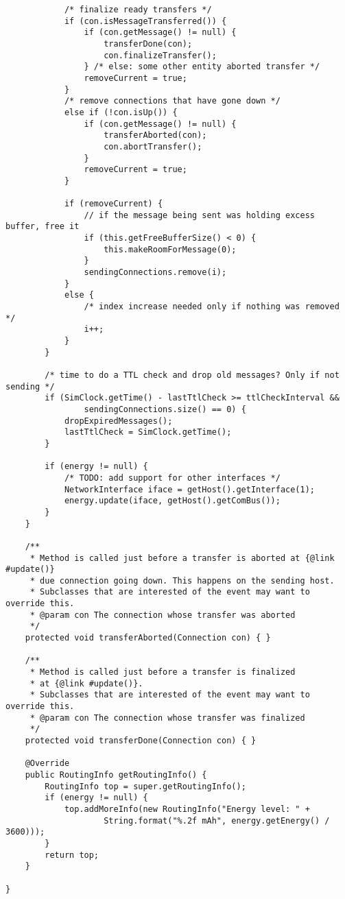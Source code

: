 \documentclass[11pt]{icsthesis}
\begin{document}
\begin{framed}
\begin{verbatim}
			/* finalize ready transfers */
			if (con.isMessageTransferred()) {
				if (con.getMessage() != null) {
					transferDone(con);
					con.finalizeTransfer();
				} /* else: some other entity aborted transfer */
				removeCurrent = true;
			}
			/* remove connections that have gone down */
			else if (!con.isUp()) {
				if (con.getMessage() != null) {
					transferAborted(con);
					con.abortTransfer();
				}
				removeCurrent = true;
			} 
			
			if (removeCurrent) {
				// if the message being sent was holding excess buffer, free it
				if (this.getFreeBufferSize() < 0) {
					this.makeRoomForMessage(0);
				}
				sendingConnections.remove(i);
			}
			else {
				/* index increase needed only if nothing was removed */
				i++;
			}
		}
		
		/* time to do a TTL check and drop old messages? Only if not sending */
		if (SimClock.getTime() - lastTtlCheck >= ttlCheckInterval && 
				sendingConnections.size() == 0) {
			dropExpiredMessages();
			lastTtlCheck = SimClock.getTime();
		}
		
		if (energy != null) {
			/* TODO: add support for other interfaces */
			NetworkInterface iface = getHost().getInterface(1);
			energy.update(iface, getHost().getComBus());
		}
	}
	
	/**
	 * Method is called just before a transfer is aborted at {@link #update()} 
	 * due connection going down. This happens on the sending host. 
	 * Subclasses that are interested of the event may want to override this. 
	 * @param con The connection whose transfer was aborted
	 */
	protected void transferAborted(Connection con) { }
	
	/**
	 * Method is called just before a transfer is finalized 
	 * at {@link #update()}.
	 * Subclasses that are interested of the event may want to override this.
	 * @param con The connection whose transfer was finalized
	 */
	protected void transferDone(Connection con) { }
	
	@Override
	public RoutingInfo getRoutingInfo() {
		RoutingInfo top = super.getRoutingInfo();
		if (energy != null) {
			top.addMoreInfo(new RoutingInfo("Energy level: " + 
					String.format("%.2f mAh", energy.getEnergy() / 3600)));
		}
		return top;
	}
	
}
\end{verbatim}
\end{framed}
\end{document}
